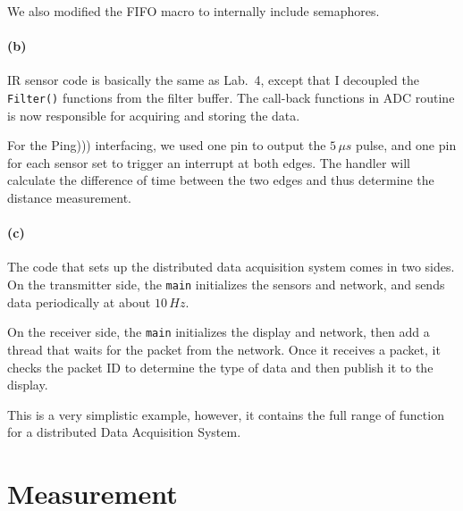 \documentclass[a4paper]{article}
\begin{document}
\lstset{language=C, style=MyCStyle}


We also modified the FIFO macro to internally include semaphores.



\paragraph{(b)} IR sensor code is basically the same as Lab.\ 4, except that I decoupled the \texttt{Filter()} functions
from the filter buffer. The call-back functions in ADC routine is now responsible for acquiring and storing the data.




For the Ping))) interfacing, we used one pin to output the $ 5 \, \mu s$ pulse, and one pin for each sensor set to
trigger an interrupt at both edges. The handler will calculate the difference of time between the two edges and thus
determine the distance measurement.




\paragraph{(c)} The code that sets up the distributed data acquisition system comes in two sides. On the transmitter side,
the \texttt{main} initializes the sensors and network, and sends data periodically at about $ 10 \, Hz $.



On the receiver side, the \texttt{main} initializes the display and network, then add a thread that waits for the packet
from the network. Once it receives a packet, it checks the packet ID to determine the type of data and then publish it
to the display.



This is a very simplistic example, however, it contains the full range of function for a distributed Data Acquisition System.

\section{Measurement}
\end{document}
